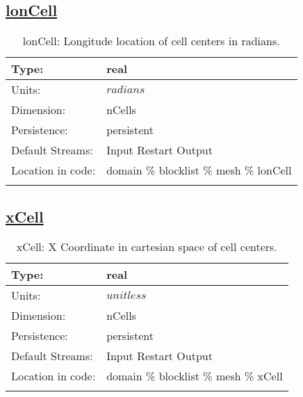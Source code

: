 \subsection[lonCell]{\hyperref[sec:var_tab_mesh]{lonCell}}
\label{subsec:var_sec_mesh_lonCell}
\begin{center}
\begin{longtable}{| p{2.0in} | p{4.0in} |}
        \hline 
        Type: & real \\
        \hline 
        Units: & $radians$ \\
        \hline 
        Dimension: & nCells \\
        \hline 
        Persistence: & persistent \\
        \hline 
		 Default Streams: & Input Restart Output  \\
        \hline 
		 Location in code: & domain \% blocklist \% mesh \% lonCell \\
		 \hline 
    \caption{lonCell: Longitude location of cell centers in radians.}
\end{longtable}
\end{center}
\subsection[xCell]{\hyperref[sec:var_tab_mesh]{xCell}}
\label{subsec:var_sec_mesh_xCell}
\begin{center}
\begin{longtable}{| p{2.0in} | p{4.0in} |}
        \hline 
        Type: & real \\
        \hline 
        Units: & $unitless$ \\
        \hline 
        Dimension: & nCells \\
        \hline 
        Persistence: & persistent \\
        \hline 
		 Default Streams: & Input Restart Output  \\
        \hline 
		 Location in code: & domain \% blocklist \% mesh \% xCell \\
		 \hline 
    \caption{xCell: X Coordinate in cartesian space of cell centers.}
\end{longtable}
\end{center}
